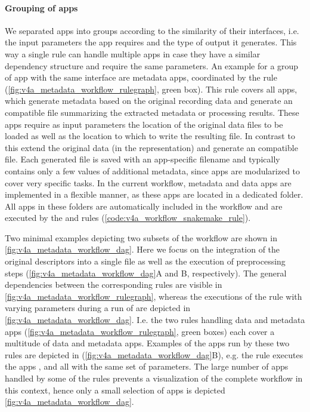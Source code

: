 \paragraph{Grouping of apps}
We separated apps into groups according to the similarity of their interfaces, i.e. the input parameters the app requires and the type of output it generates. This way a single rule can handle multiple apps in case they have a similar dependency structure and require the same parameters. An example for a group of app with the same interface are metadata apps, coordinated by the  rule (\cref{fig:v4a_metadata_workflow_rulegraph}, green box). This rule covers all apps, which generate metadata based on the original recording data and generate an  compatible  file summarizing the extracted metadata or processing results. These apps require as input parameters the location of the original data files to be loaded as well as the location to which to write the resulting  file. In contrast to this  extend the original data (in the  representation) and generate an  compatible  file. Each generated  file is saved with an app-specific filename and typically contains only a few values of additional metadata, since apps are modularized to cover very specific tasks.
In the current workflow, metadata and data apps are implemented in a flexible manner, as these apps are located in a dedicated folder. All apps in these folders are automatically included in the workflow and are executed by the  and  rules (\cref{code:v4a_workflow_snakemake_rule}).

Two minimal examples depicting two subsets of the workflow are shown in \cref{fig:v4a_metadata_workflow_dag}. Here we focus on the integration of the original  descriptors into a single  file as well as the execution of preprocessing steps (\cref{fig:v4a_metadata_workflow_dag}A and B, respectively). The general dependencies between the corresponding rules are visible in \cref{fig:v4a_metadata_workflow_rulegraph}, whereas the executions of the rule with varying parameters during a run of  are depicted in \cref{fig:v4a_metadata_workflow_dag}. I.e. the two rules handling data and metadata apps (\cref{fig:v4a_metadata_workflow_rulegraph}, green boxes) each cover a multitude of data and metadata apps. Examples of the apps run by these two rules are depicted in (\cref{fig:v4a_metadata_workflow_dag}B), e.g. the  rule executes the apps ,  and  all with the same set of parameters. The large number of apps handled by some of the rules prevents a visualization of the complete workflow in this context, hence only a small selection of apps is depicted \cref{fig:v4a_metadata_workflow_dag}.

